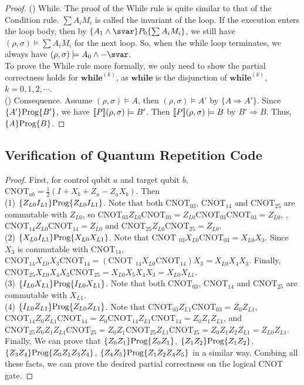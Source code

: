 \begin{proof}
(\showcnt) While. The proof of the While rule is quite similar to that of the Condition rule. $\sum A_iM_i$ is called the invariant of the loop. If the execution enters the loop body, then by $\{ A_1 \wedge \svar \}P_0\{\sum A_i M_i\}$, we still have $(\rho, \sigma) \models \sum A_i M_i$ for the next loop. So, when the while loop terminates, we always have $(\rho, \sigma) \models  A_0 \wedge -\svar$. \\
To prove the While rule more formally, we only need to show the partial correctness holds for $\textbf{while}^{(k)}$, as $\textbf{while}$ is the disjunction of $\textbf{while}^{(k)}$, $k=0,1,2,\cdots$.
\\
(\showcnt) Consequence. Assume $(\rho,\sigma) \models A$, then $ (\rho,\sigma) \models A'$ by $\{A\Rightarrow A'\}$. Since $\{A'\}\text{Prog}\{B'\}$, we have $[\![ P ]\!](\rho,\sigma) \models B'$. Then $[\![ P ]\!](\rho,\sigma) \models B$ by $B'\Rightarrow B$. Thus, $\{A\}\text{Prog}\{B\}$.
\end{proof}

\subsection{Verification of Quantum Repetition Code}
\label{app:rep}
\repcnot*
\begin{proof}
First, for control qubit $a$ and target qubit $b$, $\text{CNOT}_{ab} = \frac{1}{2}(I + X_b + Z_a - Z_aX_b)$. Then\\
(1) $\{Z_{L0} I_{L1}\}\text{Prog}\{Z_{L0}I_{L1}\}$. Note that both $\text{CNOT}_{03}$, $\text{CNOT}_{14}$ and $\text{CNOT}_{25}$ are commutable with $Z_{L0}$, so $\text{CNOT}_{03}Z_{L0}\text{CNOT}_{03} = Z_{L0}\text{CNOT}_{03}\text{CNOT}_{03} = Z_{L0}$, , $\text{CNOT}_{14}Z_{L0}\text{CNOT}_{14}= Z_{L0}$ and $\text{CNOT}_{25}Z_{L0}\text{CNOT}_{25}= Z_{L0}$. \\
(2) $\{X_{L0} I_{L1}\}\text{Prog}\{X_{L0}X_{L1}\}$. Note that $\text{CNOT }_{03}X_{L0}\text{CNOT}_{03} = X_{L0}X_3$. Since $X_3$ is commutable with $\text{CNOT}_{14}$, $\text{CNOT}_{14}X_{L0} X_3 \text{CNOT}_{14} = (\text{CNOT }_{14}X_{L0}\text{CNOT}_{14})X_3 = X_{L0}X_4X_3$. Finally, $\text{CNOT}_{25}X_{L0}X_4X_3\text{CNOT}_{25} = X_{L0}X_5X_4X_3 = X_{L0}X_{L1}$. \\
(3) $\{I_{L0} X_{L1}\}\text{Prog}\{I_{L0}X_{L1}\}$. Note that both $\text{CNOT}_{03}$, $\text{CNOT}_{14}$ and $\text{CNOT}_{25}$ are commutable with $X_{L1}$. \\
(4) $\{I_{L0} Z_{L1}\}\text{Prog}\{Z_{L0}Z_{L1}\}$. Note that  $\text{CNOT}_{03}Z_{L1}\text{CNOT}_{03} = Z_{0}Z_{L1}$, $\text{CNOT}_{14}Z_{0}Z_{L1}\text{CNOT}_{14} = Z_{0}\text{CNOT}_{14}Z_{L1}\text{CNOT}_{14} = Z_{0}Z_{1}Z_{L1}$, and $\text{CNOT}_{25}Z_{0}Z_{1}Z_{L1}\text{CNOT}_{25} = Z_{0}Z_{1}\text{CNOT}_{25}Z_{L1}\text{CNOT}_{25} = Z_{0}Z_{1}Z_{2}Z_{L1} = Z_{L0}Z_{L1}$. \\
Finally, We can prove that $\{Z_0Z_1\}\text{Prog}\{Z_0Z_1\}$, $\{Z_1Z_2\}\text{Prog}\{Z_1Z_2\}$, $\{Z_3Z_4\}\text{Prog}\{Z_0Z_1Z_3Z_4\}$, $\{Z_4Z_5\}\text{Prog}\{Z_1Z_2Z_4Z_5\}$ in a similar way. Combing all these facts, we can prove the desired partial correctness on the logical CNOT gate.
\end{proof}

